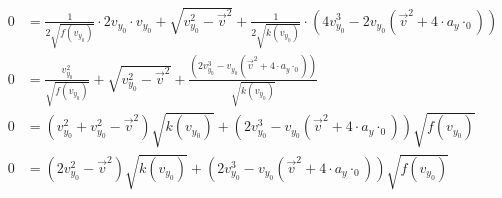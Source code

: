\documentclass[sectionformat = aufgabe]{gadsescript}
\begin{document}
\begin{enumerate}[label=\alph*)]
\begin{align*}
			0 &=  \frac{1}{2\sqrt{f(v_{y_0})}}\cdot 2v_{y_0} \cdot v_{y_0} + \sqrt{v_{y_0}^2 - \vec v^2} + \frac{1}{2 \sqrt{k(v_{y_0})}} \cdot (4 v_{y_0}^3 - 2v_{y_0} \left ( \vec v ^2 + 4 \cdot a_y \cdot_0 \right))  \\
			0 &=  \frac{v_{y_0}^2}{\sqrt{f(v_{y_0})}} + \sqrt{v_{y_0}^2 - \vec v^2} + \frac{(2 v_{y_0}^3 - v_{y_0} \left ( \vec v ^2 + 4 \cdot a_y \cdot_0 \right))}{\sqrt{k(v_{y_0})}}  \\
			0 &=  \left( v_{y_0}^2 + v_{y_0}^2 - \vec v^2 \right) \sqrt{k(v_{y_0})} + (2 v_{y_0}^3 - v_{y_0} \left ( \vec v ^2 + 4 \cdot a_y \cdot_0 \right))\sqrt{f(v_{y_0})}  \\
			0 &=  \left( 2v_{y_0}^2 - \vec v^2 \right) \sqrt{k(v_{y_0})} + (2 v_{y_0}^3 - v_{y_0} \left ( \vec v ^2 + 4 \cdot a_y \cdot_0 \right))\sqrt{f(v_{y_0})}  \\
		\end{align*}

\end{enumerate}
\end{document}
